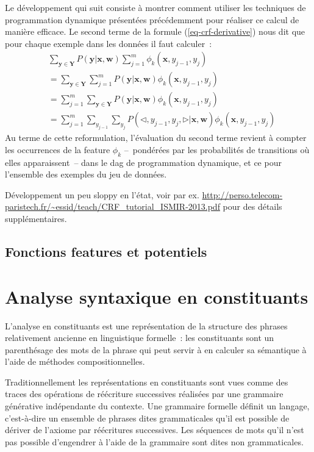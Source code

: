 \documentclass[11pt,openany]{book}
\newcommand{\ac}[1]{{\sc #1}} %
\begin{document}
Le développement qui suit consiste à montrer comment utiliser les techniques de programmation dynamique présentées précédemment pour réaliser ce calcul de manière efficace.  Le second terme de la formule (\ref{eq-crf-derivative}) nous dit que pour chaque exemple dans les données il faut calculer~:
\begin{align}
&\sum_{\mathbf{y}\in \mathbf{Y}} P(\mathbf{y}|\mathbf{x},\mathbf{w}) \sum_{j=1}^m \phi_k(\mathbf{x},y_{j-1},y_j)\\
&=\sum_{\mathbf{y}\in \mathbf{Y}} \sum_{j=1}^m P(\mathbf{y}|\mathbf{x},\mathbf{w})  \phi_k(\mathbf{x},y_{j-1},y_j)\\
&= \sum_{j=1}^m \sum_{\mathbf{y}\in \mathbf{Y}} P(\mathbf{y}|\mathbf{x},\mathbf{w})  \phi_k(\mathbf{x},y_{j-1},y_j)\\
&=  \sum_{j=1}^m \sum_{y_{j-1}}\sum_{y_j} P(\lhd,y_{j-1},y_j,\rhd|\mathbf{x},\mathbf{w})  \phi_k(\mathbf{x},y_{j-1},y_j)
\end{align}
Au terme de cette reformulation, l'évaluation du second terme revient à compter les occurrences de la feature $\phi_k$ --~pondérées par les probabilités de transitions où elles apparaissent~-- dans le \ac{dag} de programmation dynamique, et ce pour l'ensemble des exemples du jeu de données.

{\color{red} Développement un peu sloppy en l'état, voir par ex.
\url{http://perso.telecom-paristech.fr/~essid/teach/CRF_tutorial_ISMIR-2013.pdf}
pour des détails supplémentaires.}


\section{Fonctions features et potentiels}



\chapter{Analyse syntaxique en constituants}


L'analyse en constituants est une représentation de la structure des phrases relativement 
ancienne en linguistique formelle~: les constituants sont  un parenthésage des mots de la phrase 
qui peut servir à en calculer sa sémantique à l'aide de méthodes compositionnelles.

Traditionnellement les représentations en constituants sont vues comme des traces des opérations de réécriture successives 
réalisées par une grammaire générative indépendante du contexte. 
Une grammaire formelle définit un langage,  c'est-à-dire un ensemble de phrases dites grammaticales qu'il est possible de dériver de l'axiome 
par réécritures successives. Les séquences de mots qu'il n'est pas possible d'engendrer à l'aide de la grammaire sont dites non grammaticales.
\end{document}
